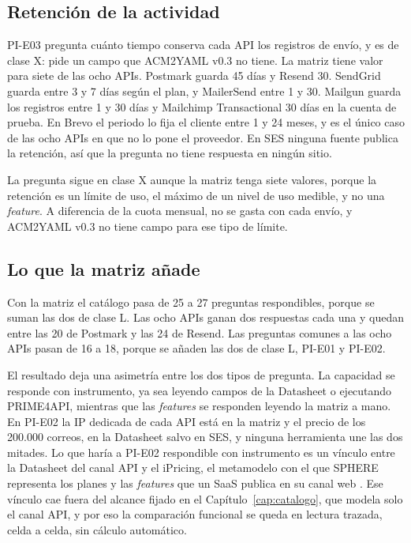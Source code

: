 \subsection{Retención de la actividad}

PI-E03 pregunta cuánto tiempo conserva cada API los registros de envío, y es de clase X: pide un campo que ACM2YAML v0.3 no tiene.
La matriz tiene valor para siete de las ocho APIs.
Postmark guarda 45 días y Resend 30.
SendGrid guarda entre 3 y 7 días según el plan, y MailerSend entre 1 y 30.
Mailgun guarda los registros entre 1 y 30 días y Mailchimp Transactional 30 días en la cuenta de prueba.
En Brevo el periodo lo fija el cliente entre 1 y 24 meses, y es el único caso de las ocho APIs en que no lo pone el proveedor.
En SES ninguna fuente publica la retención, así que la pregunta no tiene respuesta en ningún sitio.

La pregunta sigue en clase X aunque la matriz tenga siete valores, porque la retención es un límite de uso, el máximo de un nivel de uso medible, y no una \textit{feature}.
A diferencia de la cuota mensual, no se gasta con cada envío, y ACM2YAML v0.3 no tiene campo para ese tipo de límite.

\subsection{Lo que la matriz añade}

Con la matriz el catálogo pasa de 25 a 27 preguntas respondibles, porque se suman las dos de clase L.
Las ocho APIs ganan dos respuestas cada una y quedan entre las 20 de Postmark y las 24 de Resend.
Las preguntas comunes a las ocho APIs pasan de 16 a 18, porque se añaden las dos de clase L, PI-E01 y PI-E02.

El resultado deja una asimetría entre los dos tipos de pregunta.
La capacidad se responde con instrumento, ya sea leyendo campos de la Datasheet o ejecutando PRIME4API, mientras que las \textit{features} se responden leyendo la matriz a mano.
En PI-E02 la IP dedicada de cada API está en la matriz y el precio de los 200.000 correos, en la Datasheet salvo en SES, y ninguna herramienta une las dos mitades.
Lo que haría a PI-E02 respondible con instrumento es un vínculo entre la Datasheet del canal API y el iPricing, el metamodelo con el que SPHERE representa los planes y las \textit{features} que un SaaS publica en su canal web \citep{garciafernandez2024pricing4saas}.
Ese vínculo cae fuera del alcance fijado en el Capítulo~\ref{cap:catalogo}, que modela solo el canal API, y por eso la comparación funcional se queda en lectura trazada, celda a celda, sin cálculo automático.
